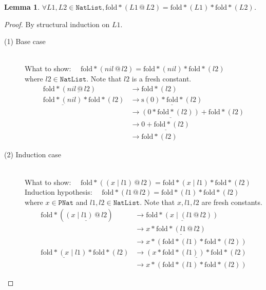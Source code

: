 \documentclass[12pt, a4paper]{article}
\newtheorem{lemma}[theorem]{Lemma}
\newcommand{\rel}[1]{\mathrel{#1}}
\newcommand{\rmx}[1]{\mathrm{#1}}
\newcommand{\larrow}{\longrightarrow}
\newcommand{\under}{\underline}
\begin{document}
\begin{lemma}
\label{lm1}
$\forall L1, L2 \in \mathtt{NatList}, \rmx{fold*}(L1 \rel{@} L2) = \rmx{fold*}(L1) \rel{*} \rmx{fold*}(L2)$.
\end{lemma}
\begin{proof}
By structural induction on $L1$.

\begin{description}

\item[(1) Base case]~\\
What to show: $\quad\rmx{fold*}(nil \rel{@} l2) = \rmx{fold*}(nil) \rel{*} \rmx{fold*}(l2)$\\
where $l2 \in \mathtt{NatList}$. Note that $l2$ is a fresh constant.
\begin{align*}
\rmx{fold*}(\under{nil \rel{@} l2}) 
	&\larrow \rmx{fold*}(l2) \tag{by @1} \\
\under{\rmx{fold*}(nil)} \rel{*} \rmx{fold*}(l2) 
	&\larrow \under{\rmx{s}(0) \rel{*} \rmx{fold*}(l2)} \tag{by fold*-1} \\
	&\larrow \under{(0 \rel{*} \rmx{fold*}(l2))} \rel{+} \rmx{fold*}(l2) \tag{by *2} \\
	&\larrow \under{0 \rel{+} \rmx{fold*}(l2)} \tag{by *1} \\
	&\larrow \rmx{fold*}(l2) \tag{by +1}
\end{align*}

\item[(2) Induction case]~\\
What to show: $\quad\rmx{fold*}((x \rel{|} l1) \rel{@} l2) = \rmx{fold*}(x \rel{|} l1) \rel{*} \rmx{fold*}(l2)$\\
Induction hypothesis: $\quad\rmx{fold*}(l1 \rel{@} l2) = \rmx{fold*}(l1) \rel{*} \rmx{fold*}(l2)$\\
where $x \in \mathtt{PNat}$ and $l1, l2 \in \mathtt{NatList}$. Note that $x, l1, l2$ are fresh constants.
\begin{align*}
\rmx{fold*}(\under{(x \rel{|} l1) \rel{@} l2}) 
	&\larrow \under{\rmx{fold*}(x \rel{|} (l1 \rel{@} l2))} \tag{by @2} \\
	&\larrow x \rel{*} \under{\rmx{fold*}(l1 \rel{@} l2)} \tag{by fold*-2} \\
	&\larrow x \rel{*} (\rmx{fold*}(l1) \rel{*} \rmx{fold*}(l2)) \tag{by IH} \\
\under{\rmx{fold*}(x \rel{|} l1)} \rel{*} \rmx{fold*}(l2) 
	&\larrow \under{(x \rel{*} \rmx{fold*}(l1)) \rel{*} \rmx{fold*}(l2)} \tag{by fold*-2} \\
	&\larrow x \rel{*} (\rmx{fold*}(l1) \rel{*} \rmx{fold*}(l2)) \tag{by assoc*}
\end{align*}
\end{description}

\end{proof}
\end{document}

